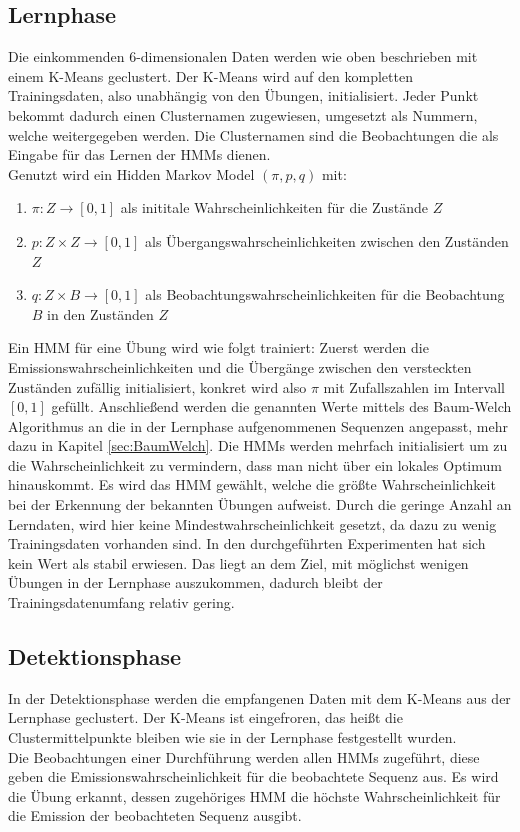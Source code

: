 \documentclass{article}
\begin{document}
\subsection{Lernphase}
Die einkommenden 6-dimensionalen Daten werden wie oben beschrieben mit einem K-Means geclustert.
Der K-Means wird auf den kompletten Trainingsdaten, also unabhängig von den Übungen, initialisiert.
Jeder Punkt bekommt dadurch einen Clusternamen zugewiesen, umgesetzt als Nummern, welche weitergegeben werden.
Die Clusternamen sind die Beobachtungen die als Eingabe für das Lernen der HMMs dienen.\\
Genutzt wird ein Hidden Markov Model $(\pi, p, q)$ mit:
\begin{enumerate}
\item $\pi: Z \rightarrow [0,1]$ als inititale Wahrscheinlichkeiten für die Zustände $Z$
\item $p: Z \times Z \rightarrow [0,1]$ als Übergangswahrscheinlichkeiten zwischen den Zuständen $Z$
\item $q: Z \times B \rightarrow [0,1]$ als Beobachtungswahrscheinlichkeiten für die Beobachtung $B$ in den Zuständen $Z$
\end{enumerate}
Ein HMM für eine Übung wird wie folgt trainiert:
Zuerst werden die Emissionswahrscheinlichkeiten und die Übergänge zwischen den versteckten Zuständen zufällig initialisiert, konkret wird also $\pi$ mit Zufallszahlen im Intervall $[0,1]$ gefüllt.
Anschließend werden die genannten Werte mittels des Baum-Welch Algorithmus an die in der Lernphase aufgenommenen Sequenzen angepasst, mehr dazu in Kapitel \ref{sec:BaumWelch}.
Die HMMs werden mehrfach initialisiert um zu die Wahrscheinlichkeit zu vermindern, dass man nicht über ein lokales Optimum hinauskommt.
Es wird das HMM gewählt, welche die größte Wahrscheinlichkeit bei der Erkennung der bekannten Übungen aufweist.
Durch die geringe Anzahl an Lerndaten, wird hier keine Mindestwahrscheinlichkeit gesetzt, da dazu zu wenig Trainingsdaten vorhanden sind.
In den durchgeführten Experimenten hat sich kein Wert als stabil erwiesen.
Das liegt an dem Ziel, mit möglichst wenigen Übungen in der Lernphase auszukommen, dadurch bleibt der Trainingsdatenumfang relativ gering.

\subsection{Detektionsphase}
In der Detektionsphase werden die empfangenen Daten mit dem K-Means aus der Lernphase geclustert.
Der K-Means ist eingefroren, das heißt die Clustermittelpunkte bleiben wie sie in der Lernphase festgestellt wurden.\\
Die Beobachtungen einer Durchführung werden allen HMMs zugeführt, diese geben die Emissionswahrscheinlichkeit für die beobachtete Sequenz aus.
Es wird die Übung erkannt, dessen zugehöriges HMM die höchste Wahrscheinlichkeit für die Emission der beobachteten Sequenz ausgibt.
\end{document}
